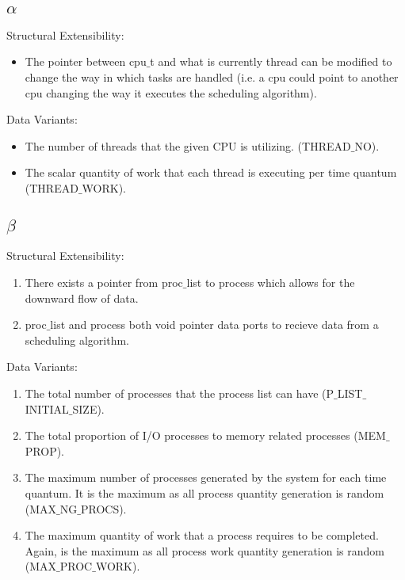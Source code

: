 \documentclass[acmsmall]{acmart}
\begin{document}
\begin{multicols}{2}
  \subsection{$\alpha$}
    Structural Extensibility:
    \begin{itemize}
      \item The pointer between cpu$\_$t and what is currently thread can be
        modified to change the way in which tasks are handled (i.e. a cpu could
        point to another cpu changing the way it executes the scheduling
        algorithm).
    \end{itemize}
    Data Variants:
    \begin{itemize}
      \item The number of threads that the given CPU is utilizing.
        (THREAD$\_$NO).
      \item The scalar quantity of work that each thread is executing per time
        quantum (THREAD$\_$WORK).
    \end{itemize}
  \subsection{$\beta$}
    Structural Extensibility:
    \begin{enumerate}
      \item There exists a pointer from proc$\_$list to process which allows for
        the downward flow of data.
      \item proc$\_$list and process both void pointer data ports to recieve
        data from a scheduling algorithm.
    \end{enumerate}
    Data Variants:
    \begin{enumerate}
      \item The total number of processes that the process list can have
        (P$\_$LIST$\_$INITIAL$\_$SIZE).
      \item The total proportion of I/O processes to memory related processes
        (MEM$\_$PROP).
      \item The maximum number of processes generated by the system for each
        time quantum. It is the maximum as all process quantity generation is
        random (MAX$\_$NG$\_$PROCS).
      \item The maximum quantity of work that a process requires to be
        completed. Again, is the maximum as all process work quantity generation
        is random (MAX$\_$PROC$\_$WORK).
    \end{enumerate}

\end{multicols}
\end{document}
